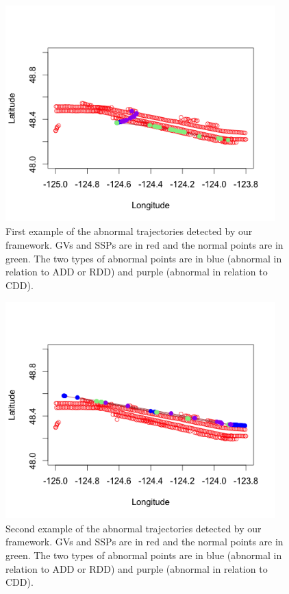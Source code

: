 \documentclass[12pt,glossary]{dalcsthesis}
\begin{document}

\begin{figure}[!hp]
\centering
\includegraphics[width=4.1in, height=3.3in]{p1.png}
\caption{First example of the abnormal trajectories detected by our framework. GVs and SSPs are in red and the normal points are in green. The two types of abnormal points are in blue (abnormal in relation to ADD or RDD) and purple (abnormal in relation to CDD).}
\label{fig:anomalydetection_tra1}
\end{figure}

\begin{figure}[!hp]
\centering
\includegraphics[width=4.1in, height=3.3in]{p2.png}
\caption{Second example of the abnormal trajectories detected by our framework. GVs and SSPs are in red and the normal points are in green. The two types of abnormal points are in blue (abnormal in relation to ADD or RDD) and purple (abnormal in relation to CDD).}
\label{fig:anomalydetection_tra2}
\end{figure}
\end{document}

